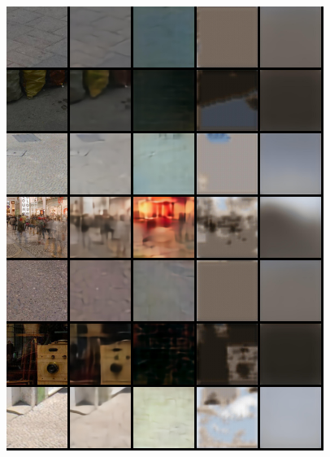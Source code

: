 \begin{appendices}
\begin{figure}
    \includegraphics[width=0.92\textwidth]{figures/ptz/train_stacked_4}
\end{figure}


\end{appendices}
